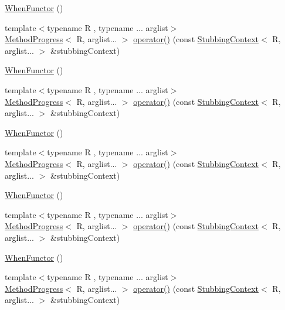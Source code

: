 \begin{DoxyCompactItemize}
\item 
\mbox{\hyperlink{classfakeit_1_1WhenFunctor_adbe70f65cae3cf3426dbc2204c13eff7}{When\+Functor}} ()
\item 
{\footnotesize template$<$typename R , typename ... arglist$>$ }\\\mbox{\hyperlink{structfakeit_1_1WhenFunctor_1_1MethodProgress}{Method\+Progress}}$<$ R, arglist... $>$ \mbox{\hyperlink{classfakeit_1_1WhenFunctor_ad93479462c8651e779ab83d2699d6a0c}{operator()}} (const \mbox{\hyperlink{structfakeit_1_1StubbingContext}{Stubbing\+Context}}$<$ R, arglist... $>$ \&stubbing\+Context)
\item 
\mbox{\hyperlink{classfakeit_1_1WhenFunctor_adbe70f65cae3cf3426dbc2204c13eff7}{When\+Functor}} ()
\item 
{\footnotesize template$<$typename R , typename ... arglist$>$ }\\\mbox{\hyperlink{structfakeit_1_1WhenFunctor_1_1MethodProgress}{Method\+Progress}}$<$ R, arglist... $>$ \mbox{\hyperlink{classfakeit_1_1WhenFunctor_ad93479462c8651e779ab83d2699d6a0c}{operator()}} (const \mbox{\hyperlink{structfakeit_1_1StubbingContext}{Stubbing\+Context}}$<$ R, arglist... $>$ \&stubbing\+Context)
\item 
\mbox{\hyperlink{classfakeit_1_1WhenFunctor_adbe70f65cae3cf3426dbc2204c13eff7}{When\+Functor}} ()
\item 
{\footnotesize template$<$typename R , typename ... arglist$>$ }\\\mbox{\hyperlink{structfakeit_1_1WhenFunctor_1_1MethodProgress}{Method\+Progress}}$<$ R, arglist... $>$ \mbox{\hyperlink{classfakeit_1_1WhenFunctor_ad93479462c8651e779ab83d2699d6a0c}{operator()}} (const \mbox{\hyperlink{structfakeit_1_1StubbingContext}{Stubbing\+Context}}$<$ R, arglist... $>$ \&stubbing\+Context)
\item 
\mbox{\hyperlink{classfakeit_1_1WhenFunctor_adbe70f65cae3cf3426dbc2204c13eff7}{When\+Functor}} ()
\item 
{\footnotesize template$<$typename R , typename ... arglist$>$ }\\\mbox{\hyperlink{structfakeit_1_1WhenFunctor_1_1MethodProgress}{Method\+Progress}}$<$ R, arglist... $>$ \mbox{\hyperlink{classfakeit_1_1WhenFunctor_ad93479462c8651e779ab83d2699d6a0c}{operator()}} (const \mbox{\hyperlink{structfakeit_1_1StubbingContext}{Stubbing\+Context}}$<$ R, arglist... $>$ \&stubbing\+Context)
\item 
\mbox{\hyperlink{classfakeit_1_1WhenFunctor_adbe70f65cae3cf3426dbc2204c13eff7}{When\+Functor}} ()
\item 
{\footnotesize template$<$typename R , typename ... arglist$>$ }\\\mbox{\hyperlink{structfakeit_1_1WhenFunctor_1_1MethodProgress}{Method\+Progress}}$<$ R, arglist... $>$ \mbox{\hyperlink{classfakeit_1_1WhenFunctor_ad93479462c8651e779ab83d2699d6a0c}{operator()}} (const \mbox{\hyperlink{structfakeit_1_1StubbingContext}{Stubbing\+Context}}$<$ R, arglist... $>$ \&stubbing\+Context)
\end{DoxyCompactItemize}


